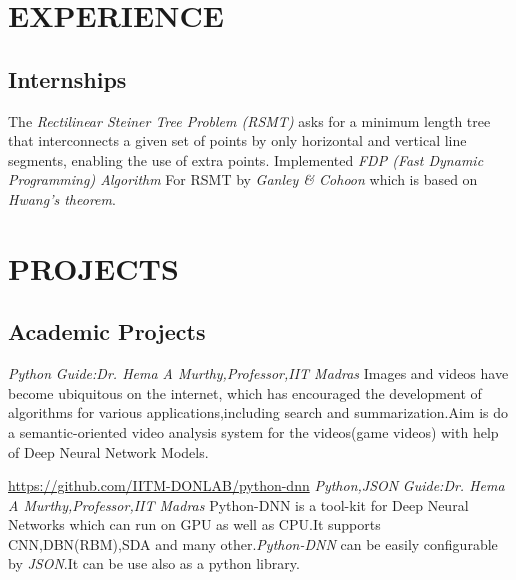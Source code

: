 \documentclass[11pt,a4paper,sans]{moderncv}
\begin{document}


\section{EXPERIENCE}
\subsection{Internships}

{The \textit{Rectilinear Steiner Tree Problem (RSMT)} asks for a minimum length tree that interconnects a given set of points by only horizontal and vertical line segments, enabling the use of extra points. Implemented \textit{ FDP (Fast Dynamic Programming) Algorithm } For RSMT by \textit{ Ganley \& Cohoon } which is based on \textit{ Hwang’s theorem}}.

\section{PROJECTS}
\subsection{Academic Projects}
{}
{\hfill \textit{Python}}
{\newline \textit{Guide:Dr. Hema A Murthy,Professor,IIT Madras}}
{Images and videos have become ubiquitous on the internet, which has encouraged the development of algorithms for various applications,including search and summarization.Aim is do a semantic-oriented video analysis system for the videos(game videos) with help of Deep Neural Network Models.}

{\newline \url{https://github.com/IITM-DONLAB/python-dnn}}
{\hfill \textit{Python,JSON}}
{\newline \textit{Guide:Dr. Hema A Murthy,Professor,IIT Madras}}
{Python-DNN is a tool-kit for Deep Neural Networks which can run on GPU as well as CPU.It supports CNN,DBN(RBM),SDA and many other.\textit{Python-DNN} can be easily configurable by \textit{JSON}.It can be use also as a python library.\newline}
\end{document}
